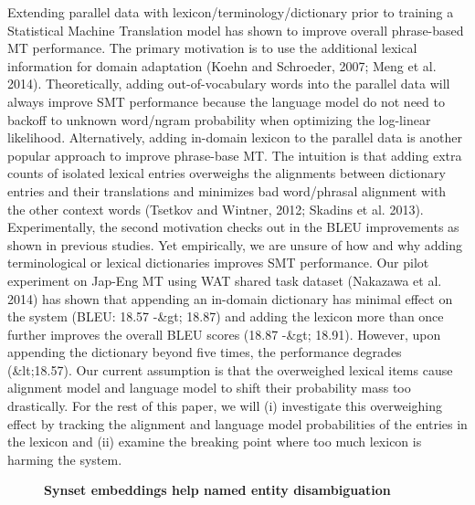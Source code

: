 \documentclass[10pt, a4paper, twopage, headinclude, footinclude, BCOR5mm]{scrartcl}
\begin{document}
\noindent
Extending parallel data with lexicon/terminology/dictionary prior to training a Statistical Machine Translation model has shown to improve overall phrase-based MT performance. The primary motivation is to use the additional lexical information for domain adaptation (Koehn and Schroeder, 2007; Meng et al. 2014). Theoretically, adding out-of-vocabulary words into the parallel data will always improve SMT performance because the language model do not need to backoff to unknown word/ngram probability when optimizing the log-linear likelihood. Alternatively, adding in-domain lexicon to the parallel data is another popular approach to improve phrase-base MT. The intuition is that adding extra counts of isolated lexical entries overweighs the alignments between dictionary entries and their translations and minimizes bad word/phrasal alignment with the other context words (Tsetkov and Wintner, 2012; Skadins et al. 2013). Experimentally, the second motivation checks out in the BLEU improvements as shown in previous studies. Yet empirically, we are unsure of how and why adding terminological or lexical dictionaries improves SMT performance. Our pilot experiment on Jap-Eng MT using WAT shared task dataset (Nakazawa et al. 2014) has shown that appending an in-domain dictionary has minimal effect on the system (BLEU: 18.57 -\&gt; 18.87) and adding the lexicon more than once further improves the overall BLEU scores (18.87 -\&gt; 18.91). However, upon appending the dictionary beyond five times, the performance degrades (\&lt;18.57). Our current assumption is that the overweighed lexical items cause alignment model and language model to shift their probability mass too drastically. For the rest of this paper, we will (i) investigate this overweighing effect by tracking the alignment and language model probabilities of the entries in the lexicon and (ii) examine the breaking point where too much lexicon is harming the system.


\newpage

\begin{figure}[t!]
\centering
\large\textbf{Synset embeddings help named entity disambiguation}
\vspace*{0.5cm}
\end{figure}


        \begin{table}[t!]
    \end{table}
\end{document}
